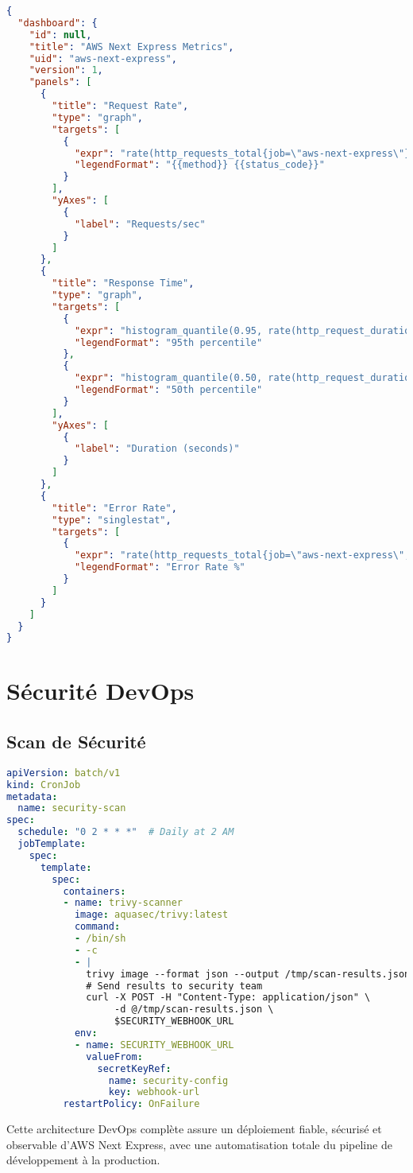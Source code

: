 \begin{lstlisting}[language=JSON, caption=monitoring/grafana-dashboard.json]
{
  "dashboard": {
    "id": null,
    "title": "AWS Next Express Metrics",
    "uid": "aws-next-express",
    "version": 1,
    "panels": [
      {
        "title": "Request Rate",
        "type": "graph",
        "targets": [
          {
            "expr": "rate(http_requests_total{job=\"aws-next-express\"}[5m])",
            "legendFormat": "{{method}} {{status_code}}"
          }
        ],
        "yAxes": [
          {
            "label": "Requests/sec"
          }
        ]
      },
      {
        "title": "Response Time",
        "type": "graph",
        "targets": [
          {
            "expr": "histogram_quantile(0.95, rate(http_request_duration_seconds_bucket{job=\"aws-next-express\"}[5m]))",
            "legendFormat": "95th percentile"
          },
          {
            "expr": "histogram_quantile(0.50, rate(http_request_duration_seconds_bucket{job=\"aws-next-express\"}[5m]))",
            "legendFormat": "50th percentile"
          }
        ],
        "yAxes": [
          {
            "label": "Duration (seconds)"
          }
        ]
      },
      {
        "title": "Error Rate",
        "type": "singlestat",
        "targets": [
          {
            "expr": "rate(http_requests_total{job=\"aws-next-express\",status_code=~\"5..\"}[5m]) / rate(http_requests_total{job=\"aws-next-express\"}[5m]) * 100",
            "legendFormat": "Error Rate %"
          }
        ]
      }
    ]
  }
}
\end{lstlisting}

\section{Sécurité DevOps}

\subsection{Scan de Sécurité}

\begin{lstlisting}[language=YAML, caption=security/security-scan.yaml]
apiVersion: batch/v1
kind: CronJob
metadata:
  name: security-scan
spec:
  schedule: "0 2 * * *"  # Daily at 2 AM
  jobTemplate:
    spec:
      template:
        spec:
          containers:
          - name: trivy-scanner
            image: aquasec/trivy:latest
            command:
            - /bin/sh
            - -c
            - |
              trivy image --format json --output /tmp/scan-results.json ghcr.io/nourhb/aws-next-express:latest
              # Send results to security team
              curl -X POST -H "Content-Type: application/json" \
                   -d @/tmp/scan-results.json \
                   $SECURITY_WEBHOOK_URL
            env:
            - name: SECURITY_WEBHOOK_URL
              valueFrom:
                secretKeyRef:
                  name: security-config
                  key: webhook-url
          restartPolicy: OnFailure
\end{lstlisting}

Cette architecture DevOps complète assure un déploiement fiable, sécurisé et observable d'AWS Next Express, avec une automatisation totale du pipeline de développement à la production. 